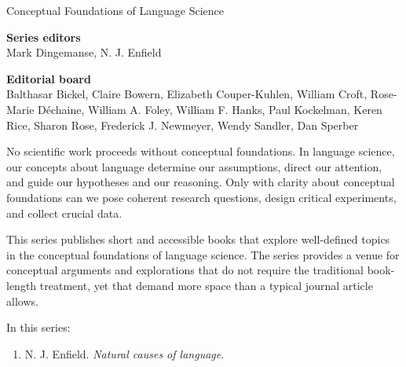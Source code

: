 {\large Conceptual Foundations of Language Science}

\bigskip

\textbf{Series editors}\\
Mark Dingemanse, %
N. J. Enfield %


\bigskip


\textbf{Editorial board} \\
Balthasar Bickel, %
Claire Bowern, %
Elizabeth Couper-Kuhlen, %
William Croft, %
Rose-Marie Déchaine, %
William A. Foley, %
William F. Hanks, %
Paul Kockelman, %
Keren Rice, %
Sharon Rose, %
Frederick J. Newmeyer, %
Wendy Sandler, %
Dan Sperber %


\bigskip

\begin{minipage}{\textwidth}%

No scientific work proceeds without conceptual foundations. In language science, our concepts about language determine our assumptions, direct our attention, and guide our hypotheses and our reasoning. Only with clarity about conceptual foundations can we pose coherent research questions, design critical experiments, and collect crucial data. 

\medskip

This series publishes short and accessible books that explore well-defined topics in the conceptual foundations of language science. The series provides a venue for conceptual arguments and explorations that do not require the traditional book-length treatment, yet that demand more space than a typical journal article allows.  
\end{minipage}

\bigskip

In this series:

\begin{enumerate}
\item N. J. Enfield. \textit{Natural causes of language}.

\end{enumerate}


